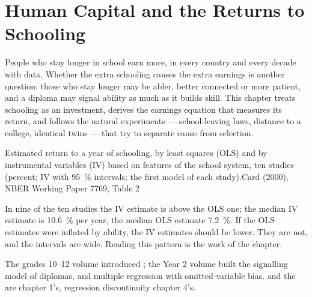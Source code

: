 \chapter{Human Capital and the Returns to Schooling}\label{ch:b3:human-capital}

People who stay longer in school earn more, in every country and every decade with
data. Whether the extra schooling causes the extra earnings is another question:
those who stay longer may be abler, better connected or more patient, and a diploma
may signal ability as much as it builds skill. This chapter treats schooling as an
investment, derives the earnings equation that measures its return, and follows
the natural experiments --- school-leaving laws, distance to a college, identical
twins --- that try to separate cause from selection.

\begin{openingchart}{Estimated return to a year of schooling, by least squares (OLS)
and by instrumental variables (IV) based on features of the school system, ten
studies (percent; IV with 95~\% intervals; the first model of each study).}{Card
(2000), NBER Working Paper 7769, Table 2}
\end{openingchart}

In nine of the ten studies the IV estimate is above the OLS one; the median IV
estimate is 10.6~\% per year, the median OLS estimate 7.2~\%. If the OLS estimates were
inflated by ability, the IV estimates should be lower. They are not, and the
intervals are wide. Reading this pattern is the work of the chapter.

\begin{recall}
The grades 10--12 volume introduced ; the Year 2 volume built the
signalling model of diplomas, and multiple regression with omitted-variable bias.
 and the  are chapter 1's,
regression discontinuity chapter 4's.
\end{recall}

